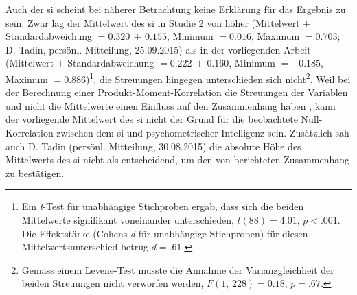 \documentclass[11pt, twoside, a4paper]{book}		%
\begin{document}
Auch der \gls{si} scheint bei näherer Betrachtung keine Erklärung für das Ergebnis zu sein. Zwar lag der Mittelwert des \gls{si} in Studie 2 von \citet{Melnick2013} höher (Mittelwert $\pm$ Standardabweichung $=0.320\,\pm\,0.155$, Minimum $=0.016$, Maximum $=0.703$; D. Tadin, persönl. Mitteilung, 25.09.2015) als in der vorliegenden Arbeit (Mittelwert $\pm$ Standardabweichung $=0.222\,\pm\,0.160$, Minimum $= -0.185$, Maximum $= 0.886$)\footnote{Ein \textit{t}-Test für unabhängige Stichproben ergab, dass sich die beiden Mittelwerte signifikant voneinander unterschieden, $t(88)=4.01$, $p<.001$. Die Effektstärke (Cohens \textit{d} für unabhängige Stichproben) für diesen Mittelwertsunterschied betrug $d=.61$.}, die Streuungen hingegen unterschieden sich nicht\footnote{Gemäss einem Levene-Test musste die Annahme der Varianzgleichheit der beiden Streuungen nicht verworfen werden, $F(1,\,228)=0.18$, $p=.67$.}. 
Weil bei der Berechnung einer Produkt-Moment-Korrelation die Streuungen der Variablen und nicht die Mittelwerte einen Einfluss auf den Zusammenhang haben \citep[S. 506]{Eid2013}, kann der vorliegende Mittelwert des \gls{si} nicht der Grund für die beobachtete Null-Korrelation zwischen dem \gls{si} und psychometrischer Intelligenz sein. Zusätzlich sah auch D. Tadin (persönl. Mitteilung, 30.08.2015) die absolute Höhe des Mittelwerts des \gls{si} nicht als entscheidend, um den von \citeauthor{Melnick2013} berichteten Zusammenhang zu bestätigen.
\end{document}
